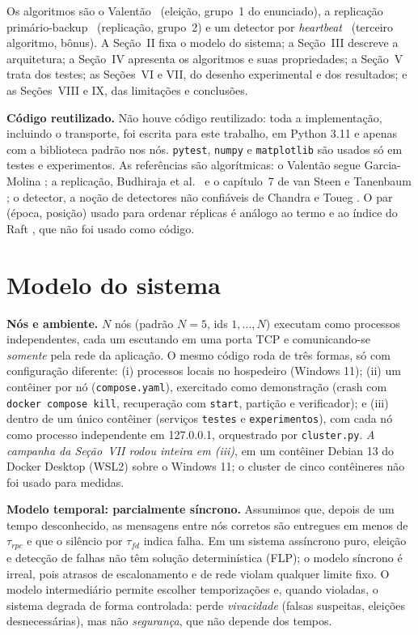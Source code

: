 \documentclass[conference,a4paper]{IEEEtran}
\begin{document}
Os algoritmos são o Valentão~\cite{garcia1982} (eleição, grupo~1 do
enunciado), a replicação primário-backup~\cite{budhiraja1993,vansteen2023}
(replicação, grupo~2) e um detector por \emph{heartbeat}~\cite{chandra1996}
(terceiro algoritmo, bônus). A Seção~II fixa o modelo do sistema; a
Seção~III descreve a arquitetura; a Seção~IV apresenta os algoritmos e suas
propriedades; a Seção~V trata dos testes; as Seções~VI e VII, do desenho
experimental e dos resultados; e as Seções~VIII e IX, das limitações e
conclusões.

\textbf{Código reutilizado.} Não houve código reutilizado: toda a
implementação, incluindo o transporte, foi escrita para este trabalho, em
Python 3.11 e apenas com a biblioteca padrão nos nós. \texttt{pytest},
\texttt{numpy} e \texttt{matplotlib} são usados só em testes e experimentos.
As referências são algorítmicas: o Valentão segue Garcia-Molina
\cite{garcia1982}; a replicação, Budhiraja et al.\ \cite{budhiraja1993} e o
capítulo~7 de van Steen e Tanenbaum \cite{vansteen2023}; o detector, a
noção de detectores não confiáveis de Chandra e Toueg \cite{chandra1996}. O
par (época, posição) usado para ordenar réplicas é análogo ao termo e ao
índice do Raft \cite{ongaro2014}, que não foi usado como código.

\section{Modelo do sistema}

\textbf{Nós e ambiente.} $N$ nós (padrão $N=5$, ids $1,\dots,N$) executam
como processos independentes, cada um escutando em uma porta TCP e
comunicando-se \emph{somente} pela rede da aplicação. O mesmo código roda de
três formas, só com configuração diferente: (i) processos locais no
hospedeiro (Windows 11); (ii) um contêiner por nó (\texttt{compose.yaml}),
exercitado como demonstração (crash com \texttt{docker compose kill},
recuperação com \texttt{start}, partição e verificador); e (iii) dentro de
um único contêiner (serviços \texttt{testes} e \texttt{experimentos}), com
cada nó como processo independente em 127.0.0.1, orquestrado por
\texttt{cluster.py}. \emph{A campanha da Seção~VII rodou inteira em (iii)}, em
um contêiner Debian 13 do Docker Desktop (WSL2) sobre o Windows 11; o cluster
de cinco contêineres não foi usado para medidas.

\textbf{Modelo temporal: parcialmente síncrono.} Assumimos que, depois de um
tempo desconhecido, as mensagens entre nós corretos são entregues em menos
de $\tau_{rpc}$ e que o silêncio por $\tau_{fd}$ indica falha. Em um sistema
assíncrono puro, eleição e detecção de falhas não têm solução determinística
(FLP); o modelo síncrono é irreal, pois atrasos de escalonamento e de rede
violam qualquer limite fixo. O modelo intermediário permite escolher
temporizações e, quando violadas, o sistema degrada de forma controlada:
perde \emph{vivacidade} (falsas suspeitas, eleições desnecessárias), mas não
\emph{segurança}, que não depende dos tempos.
\end{document}
